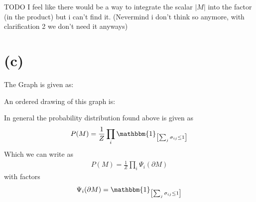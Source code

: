 \documentclass[a4paper]{scrartcl}
\begin{document}

{\color{red}
TODO I feel like there would be a way to integrate the scalar $\lvert M \rvert$ into the factor (in the product) but i can't find it. (Nevermind i don't think so anymore, with clarification 2 we don't need it anyways)
}

\section*{(c)}

The Graph is given as:


An ordered drawing of this graph is:


  





In general the probability distribution found above is given as
\begin{align}
    P(M) = \frac{1}{Z}\prod_i \mathbbm{1}_{\left[\sum_j \sigma_{ij} \leq 1\right]}
\end{align}
Which we can write as 
\begin{align}
    P(M) = \frac{1}{Z} \prod_i \Psi_i(\partial M)
\end{align}
with factors
\begin{align}
    \Psi_i(\partial M) = \mathbbm{1}_{\left[ \sum_j \sigma_{ij} \leq 1 \right]}
\end{align}
\end{document}
